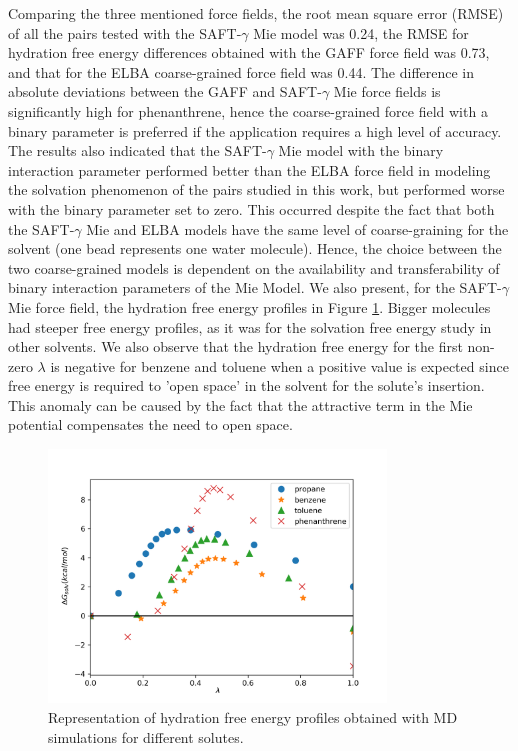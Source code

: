 Comparing the three mentioned force fields, the root mean square error (RMSE) of all the pairs tested with the SAFT-$\gamma$ Mie model was  0.24, the RMSE for hydration free energy differences obtained with the GAFF force field was 0.73, and that for the ELBA coarse-grained force field was 0.44. The difference in absolute deviations between the GAFF and SAFT-$\gamma$ Mie force fields is significantly high for phenanthrene, hence the coarse-grained force field with a binary parameter is preferred if the application requires a high level of accuracy. The results also indicated that the SAFT-$\gamma$ Mie model with the binary interaction parameter performed better than the ELBA force field in modeling the solvation phenomenon of the pairs studied in this work, but performed worse with the binary parameter set to zero. This occurred despite the fact that both the SAFT-$\gamma$ Mie and ELBA models have the same level of coarse-graining for the solvent (one bead represents one water molecule). Hence, the choice between the two coarse-grained models is dependent on the availability and transferability of binary interaction parameters of the Mie Model. We also present, for the SAFT-$\gamma$ Mie force field, the hydration free energy profiles in Figure \ref{fig:water}. Bigger molecules had steeper free energy profiles, as it was for the solvation free energy study in other solvents. We also observe that the hydration free energy for the first non-zero $\lambda$ is negative for benzene and toluene when a positive value is expected since free energy is required to 'open space' in the solvent for the solute's insertion. This anomaly can be caused by the fact that the attractive term in the Mie potential compensates the need to open space. 

\begin{figure}[H]
\centering
\includegraphics[width=0.8\textwidth]{Figures/water}
\caption{Representation of hydration free energy profiles obtained with MD simulations for different solutes.}
\label{fig:water}
\end{figure}

